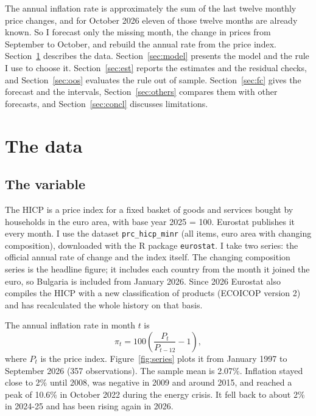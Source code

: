 \documentclass[11pt]{article}
\begin{document}
The annual inflation rate is approximately the sum of the last twelve monthly price changes, and for October 2026 eleven of those twelve months are already known. So I forecast only the missing month, the change in prices from September to October, and rebuild the annual rate from the price index. Section~\ref{sec:data} describes the data. Section~\ref{sec:model} presents the model and the rule I use to choose it. Section~\ref{sec:est} reports the estimates and the residual checks, and Section~\ref{sec:oos} evaluates the rule out of sample. Section~\ref{sec:fc} gives the forecast and the intervals, Section~\ref{sec:others} compares them with other forecasts, and Section~\ref{sec:concl} discusses limitations.

\section{The data}
\label{sec:data}

\subsection{The variable}

The HICP is a price index for a fixed basket of goods and services bought by households in the euro area, with base year 2025 = 100. Eurostat publishes it every month. I use the dataset \texttt{prc\_hicp\_minr} (all items, euro area with changing composition), downloaded with the R package \texttt{eurostat}. I take two series: the official annual rate of change and the index itself. The changing composition series is the headline figure; it includes each country from the month it joined the euro, so Bulgaria is included from January 2026. Since 2026 Eurostat also compiles the HICP with a new classification of products (ECOICOP version 2) and has recalculated the whole history on that basis.

The annual inflation rate in month $t$ is
\begin{equation}
\pi_t = 100\left(\frac{P_t}{P_{t-12}}-1\right),
\label{eq:yoy}
\end{equation}
where $P_t$ is the price index. Figure~\ref{fig:series} plots it from January 1997 to September 2026 (357 observations). The sample mean is 2.07\%. Inflation stayed close to 2\% until 2008, was negative in 2009 and around 2015, and reached a peak of 10.6\% in October 2022 during the energy crisis. It fell back to about 2\% in 2024-25 and has been rising again in 2026.
\end{document}
